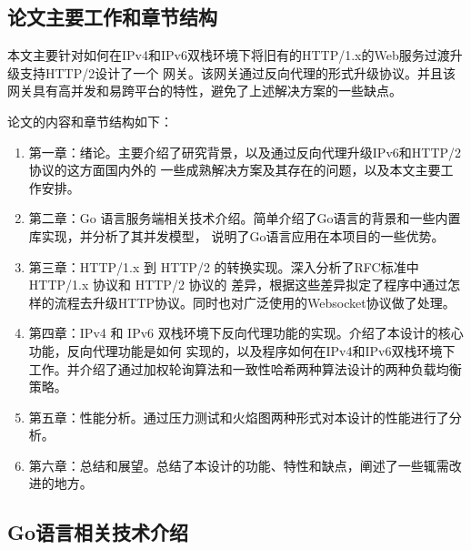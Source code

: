 \documentclass[twoside]{CUGThesis}
\begin{document}
	\subsection{论文主要工作和章节结构}
	本文主要针对如何在IPv4和IPv6双栈环境下将旧有的HTTP/1.x的Web服务过渡升级支持HTTP/2设计了一个
	网关。该网关通过反向代理的形式升级协议。并且该网关具有高并发和易跨平台的特性，避免了上述解决方案的一些缺点。\par 
	论文的内容和章节结构如下：
	\begin{enumerate}
		\item 第一章：绪论。主要介绍了研究背景，以及通过反向代理升级IPv6和HTTP/2协议的这方面国内外的
		一些成熟解决方案及其存在的问题，以及本文主要工作安排。
		\item 第二章：Go 语言服务端相关技术介绍。简单介绍了Go语言的背景和一些内置库实现，并分析了其并发模型，
		说明了Go语言应用在本项目的一些优势。
		\item 第三章：HTTP/1.x 到 HTTP/2 的转换实现。深入分析了RFC标准中 HTTP/1.x 协议和 HTTP/2 协议的
		差异，根据这些差异拟定了程序中通过怎样的流程去升级HTTP协议。同时也对广泛使用的Websocket协议做了处理。
		\item 第四章：IPv4 和 IPv6 双栈环境下反向代理功能的实现。介绍了本设计的核心功能，反向代理功能是如何
		实现的，以及程序如何在IPv4和IPv6双栈环境下工作。并介绍了通过加权轮询算法和一致性哈希两种算法设计的两种负载均衡策略。
		\item 第五章：性能分析。通过压力测试和火焰图两种形式对本设计的性能进行了分析。
		\item 第六章：总结和展望。总结了本设计的功能、特性和缺点，阐述了一些辄需改进的地方。
	\end{enumerate}
	
	\begin{spacing}{2}
		\section{Go语言相关技术介绍}
	\end{spacing}
\end{document}
